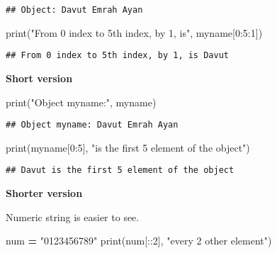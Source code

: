 \documentclass[
]{book}
\newenvironment{Shaded}{\begin{snugshade}}{\end{snugshade}}
\newcommand{\BuiltInTok}[1]{#1}
\newcommand{\DecValTok}[1]{\textcolor[rgb]{0.00,0.00,0.81}{#1}}
\newcommand{\NormalTok}[1]{#1}
\newcommand{\OperatorTok}[1]{\textcolor[rgb]{0.81,0.36,0.00}{\textbf{#1}}}
\newcommand{\StringTok}[1]{\textcolor[rgb]{0.31,0.60,0.02}{#1}}
\begin{document}
\begin{verbatim}
## Object: Davut Emrah Ayan
\end{verbatim}

\begin{Shaded}
\begin{Highlighting}[]
\BuiltInTok{print}\NormalTok{(}\StringTok{"From 0 index to 5th index, by 1, is"}\NormalTok{, myname[}\DecValTok{0}\NormalTok{:}\DecValTok{5}\NormalTok{:}\DecValTok{1}\NormalTok{])}
\end{Highlighting}
\end{Shaded}

\begin{verbatim}
## From 0 index to 5th index, by 1, is Davut
\end{verbatim}

\textbf{Short version}

\begin{Shaded}
\begin{Highlighting}[]
\BuiltInTok{print}\NormalTok{(}\StringTok{"Object myname:"}\NormalTok{, myname)}
\end{Highlighting}
\end{Shaded}

\begin{verbatim}
## Object myname: Davut Emrah Ayan
\end{verbatim}

\begin{Shaded}
\begin{Highlighting}[]
\BuiltInTok{print}\NormalTok{(myname[}\DecValTok{0}\NormalTok{:}\DecValTok{5}\NormalTok{], }\StringTok{"is the first 5 element of the object"}\NormalTok{)}
\end{Highlighting}
\end{Shaded}

\begin{verbatim}
## Davut is the first 5 element of the object
\end{verbatim}

\textbf{Shorter version}

Numeric string is easier to see.

\begin{Shaded}
\begin{Highlighting}[]
\NormalTok{num }\OperatorTok{=} \StringTok{"0123456789"}
\BuiltInTok{print}\NormalTok{(num[::}\DecValTok{2}\NormalTok{], }\StringTok{"every 2 other element"}\NormalTok{)}
\end{Highlighting}
\end{Shaded}
\end{document}
